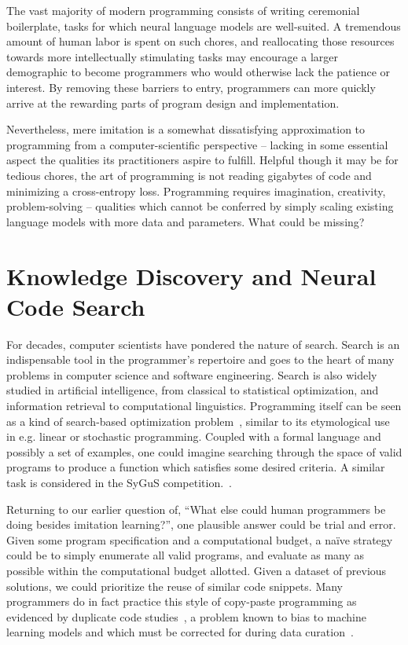 \documentclass[10pt]{article}
\begin{document}
The vast majority of modern programming consists of writing ceremonial boilerplate, tasks for which neural language models are well-suited. A tremendous amount of human labor is spent on such chores, and reallocating those resources towards more intellectually stimulating tasks may encourage a larger demographic to become programmers who would otherwise lack the patience or interest. By removing these barriers to entry, programmers can more quickly arrive at the rewarding parts of program design and implementation.

Nevertheless, mere imitation is a somewhat dissatisfying approximation to programming from a computer-scientific perspective -- lacking in some essential aspect the qualities its practitioners aspire to fulfill. Helpful though it may be for tedious chores, the art of programming is not reading gigabytes of code and minimizing a cross-entropy loss. Programming requires imagination, creativity, problem-solving -- qualities which cannot be conferred by simply scaling existing language models with more data and parameters. What could be missing?

\section{Knowledge Discovery and Neural Code Search}

For decades, computer scientists have pondered the nature of search. Search is an indispensable tool in the programmer's repertoire and goes to the heart of many problems in computer science and software engineering. Search is also widely studied in artificial intelligence, from classical to statistical optimization, and information retrieval to computational linguistics. Programming itself can be seen as a kind of search-based optimization problem~\cite{alur2018search}, similar to its etymological use in e.g. linear or stochastic programming. Coupled with a formal language and possibly a set of examples, one could imagine searching through the space of valid programs to produce a function which satisfies some desired criteria. A similar task is considered in the SyGuS competition.~\cite{alur2016sygus}.

Returning to our earlier question of, ``What else could human programmers be doing besides imitation learning?'', one plausible answer could be trial and error. Given some program specification and a computational budget, a naïve strategy could be to simply enumerate all valid programs, and evaluate as many as possible within the computational budget allotted. Given a dataset of previous solutions, we could prioritize the reuse of similar code snippets. Many programmers do in fact practice this style of copy-paste programming as evidenced by duplicate code studies~\cite{lopes2017dejavu}, a problem known to bias to machine learning models and which must be corrected for during data curation~\cite{allamanis2019adverse}.
\end{document}
